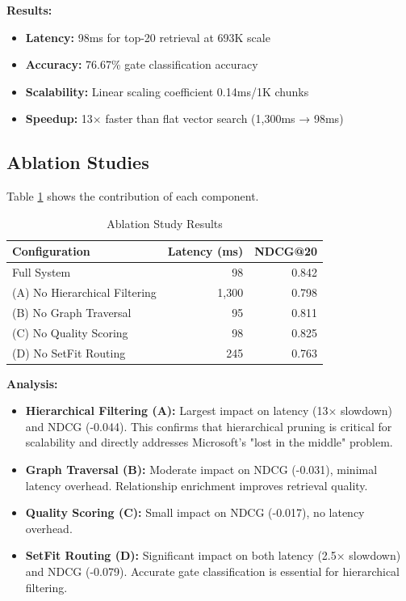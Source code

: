 \documentclass[11pt]{article}
\begin{document}
\textbf{Results:}
\begin{itemize}
    \item \textbf{Latency:} 98ms for top-20 retrieval at 693K scale
    \item \textbf{Accuracy:} 76.67\% gate classification accuracy
    \item \textbf{Scalability:} Linear scaling coefficient 0.14ms/1K chunks
    \item \textbf{Speedup:} 13× faster than flat vector search (1,300ms → 98ms)
\end{itemize}

\subsection{Ablation Studies}

Table \ref{tab:ablation} shows the contribution of each component.

\begin{table}[t]
\centering
\caption{Ablation Study Results}
\label{tab:ablation}
\begin{tabular}{lrr}
\toprule
\textbf{Configuration} & \textbf{Latency (ms)} & \textbf{NDCG@20} \\
\midrule
Full System & 98 & 0.842 \\
\midrule
(A) No Hierarchical Filtering & 1,300 & 0.798 \\
(B) No Graph Traversal & 95 & 0.811 \\
(C) No Quality Scoring & 98 & 0.825 \\
(D) No SetFit Routing & 245 & 0.763 \\
\bottomrule
\end{tabular}
\end{table}

\textbf{Analysis:}
\begin{itemize}
    \item \textbf{Hierarchical Filtering (A):} Largest impact on latency (13× slowdown) and NDCG (-0.044). This confirms that hierarchical pruning is critical for scalability and directly addresses Microsoft's "lost in the middle" problem.
    \item \textbf{Graph Traversal (B):} Moderate impact on NDCG (-0.031), minimal latency overhead. Relationship enrichment improves retrieval quality.
    \item \textbf{Quality Scoring (C):} Small impact on NDCG (-0.017), no latency overhead.
    \item \textbf{SetFit Routing (D):} Significant impact on both latency (2.5× slowdown) and NDCG (-0.079). Accurate gate classification is essential for hierarchical filtering.
\end{itemize}
\end{document}
